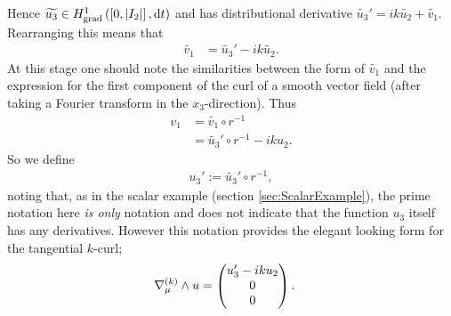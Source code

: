 Hence $\widetilde{u_3}\in H^1_\mathrm{grad}\left( \left[ 0,\lvert I_2 \rvert \right], \mathrm{d}t \right)$ and has distributional derivative $\widetilde{u_3}' = ik\widetilde{u_2} + \widetilde{v_1}$.
Rearranging this means that 
\begin{align*}
\widetilde{v_1} &= \widetilde{u_3}' - ik\widetilde{u_2}.
\end{align*}
At this stage one should note the similarities between the form of $\widetilde{v_1}$ and the expression for the first component of the curl of a smooth vector field (after taking a Fourier transform in the $x_3$-direction).
Thus 
\begin{align*}
	v_1 &= \widetilde{v_1}\circ r^{-1} \\
	&= \widetilde{u_3}'\circ r^{-1} - iku_2.
\end{align*}
So we define
\begin{align*}
	u_3' := \widetilde{u_3}'\circ r^{-1},
\end{align*}
noting that, as in the scalar example (section \ref{sec:ScalarExample}), the prime notation here \textit{is only} notation and does not indicate that the function $u_3$ itself has any derivatives.
However this notation provides the elegant looking form for the tangential $k$-curl;
\begin{align*}
	\nabla_{\mu}^{(k)}\wedge u &= \begin{pmatrix} u_3^{\prime} - iku_2 \\ 0 \\ 0 \end{pmatrix}.
\end{align*}

